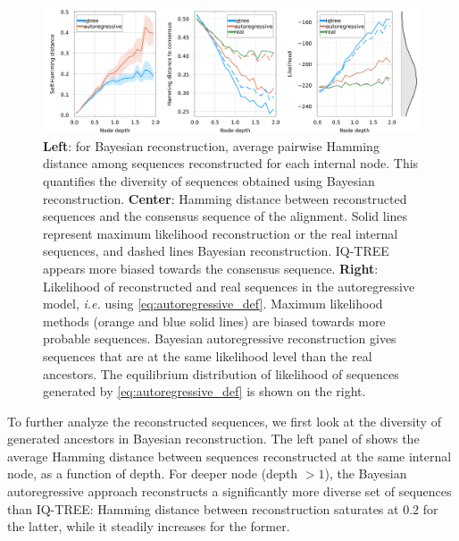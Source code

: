 \begin{figure}
	\centering
	\includegraphics[width = \textwidth]{figures/diversity_likelihood_arnet_PF00072.png}
	\caption{
		\textbf{Left}: for Bayesian reconstruction, average pairwise Hamming distance among sequences reconstructed for each internal node. This quantifies the diversity of sequences obtained using Bayesian reconstruction. 
		\textbf{Center}: Hamming distance between reconstructed sequences and the consensus sequence of the alignment. Solid lines represent maximum likelihood reconstruction or the real internal sequences, and dashed lines Bayesian reconstruction. IQ-TREE appears more biased towards the consensus sequence. 
		\textbf{Right}: Likelihood of reconstructed and real sequences in the autoregressive model, \emph{i.e.} using \eqref{eq:autoregressive_def}. Maximum likelihood methods (orange and blue solid lines) are biased towards more probable sequences. 
		Bayesian autoregressive reconstruction gives sequences that are at the same likelihood level than the real ancestors. The equilibrium distribution of likelihood of sequences generated by \eqref{eq:autoregressive_def} is shown on the right. 
	}
	\label{fig:diversity_likelihood_arnet}
\end{figure}

To further analyze the reconstructed sequences, we first look at the diversity of generated ancestors in Bayesian reconstruction. 
The left panel of  shows the average Hamming distance between sequences reconstructed at the same internal node, as a function of depth. 
For deeper node (depth $>1$), the Bayesian autoregressive approach reconstructs a significantly more diverse set of sequences than IQ-TREE: Hamming distance between reconstruction saturates at $0.2$ for the latter, while it steadily increases for the former. 


